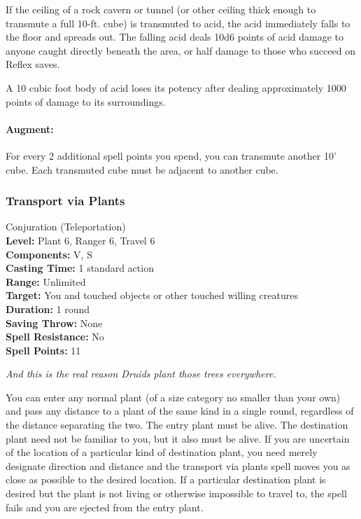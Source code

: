 If the ceiling of a rock cavern or tunnel (or other ceiling thick enough to transmute a full 10-ft. cube) is transmuted to acid, the acid immediately falls to the floor and spreads out. 
The falling acid deals 10d6 points of acid damage to anyone caught directly beneath the area, or half damage to those who succeed on Reflex saves.

A 10 cubic foot body of acid loses its potency after dealing approximately 1000 points of damage to its surroundings.

\paragraph{Augment:} For every 2 additional spell points you spend, you can transmute another 10' cube. Each transmuted cube must be adjacent to another cube.
\subsubsection{Transport via Plants}
\label{Spell:TransportViaPlants}
Conjuration (Teleportation)
\\ \textbf{Level:} Plant 6, Ranger 6, Travel 6
\\ \textbf{Components:} V, S
\\ \textbf{Casting Time:} 1 standard action
\\ \textbf{Range:} Unlimited
\\ \textbf{Target:} You and touched objects or other touched willing creatures
\\ \textbf{Duration:} 1 round
\\ \textbf{Saving Throw:} None
\\ \textbf{Spell Resistance:} No
\\ \textbf{Spell Points:} 11

\emph{And this is the real reason Druids plant those trees everywhere.}

You can enter any normal plant (of a size category no smaller than your own) and pass any distance to a plant of the same kind in a single round, regardless of the distance separating the two.
The entry plant must be alive. 
The destination plant need not be familiar to you, but it also must be alive. 
If you are uncertain of the location of a particular kind of destination plant, you need merely designate direction and distance and the transport via plants spell moves you as close as possible to the desired location. 
If a particular destination plant is desired but the plant is not living or otherwise impossible to travel to, the spell fails and you are ejected from the entry plant.

